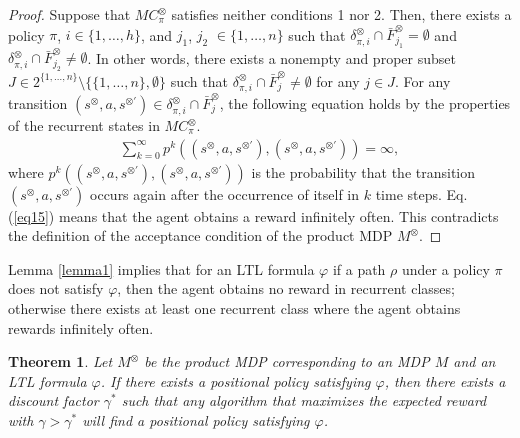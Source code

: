 \documentclass[letterpaper, 10 pt, conference]{ieeeconf}  %
\newtheorem{theorem}{Theorem}
\begin{document}
\begin{proof}
  Suppose that $MC^{\otimes}_{\pi}$ satisfies neither conditions 1 nor 2. Then, there exists a policy $\pi$, $i \in \{ 1, \ldots ,h \}$, and $j_1$, $j_2$ $\in \{ 1, \ldots ,n \}$ such that $\delta^{\otimes}_{\pi,i} \cap \bar{F}^{\otimes}_{j_1} = \emptyset$ and $\delta^{\otimes}_{\pi,i} \cap \bar{F}^{\otimes}_{j_2} \neq \emptyset$. In other words, there exists a nonempty and proper subset $J \in 2^{\{ 1, \ldots ,n \}} \setminus \{ \{ 1, \ldots ,n \}, \emptyset \}$ such that $ \delta^{\otimes}_{\pi,i} \cap \bar{F}^{\otimes}_j \neq \emptyset $ for any $j \in J$.
   For any transition $ (s^{\otimes},a,s^{\otimes \prime}) \in \delta^{\otimes}_{\pi,i} \cap \bar{F}^{\otimes}_j$, the following equation holds by the properties of the recurrent states in $MC^{\otimes}_{\pi}$\cite{ESS}.
  \begin{align}
    \sum_{k=0}^{\infty} p^k((s^{\otimes},a,s^{\otimes \prime}),(s^{\otimes},a,s^{\otimes \prime})) = \infty,
    \label{eq15}
  \end{align}
  where $p^k((s^{\otimes},a,s^{\otimes \prime}),(s^{\otimes},a,s^{\otimes \prime}))$ is the probability that the transition $(s^{\otimes},a,s^{\otimes \prime})$ occurs again after the occurrence of itself in $k$ time steps. Eq. (\ref{eq15}) means that the agent obtains a reward infinitely often. This contradicts the definition of the acceptance condition of the product MDP $M^{\otimes}$.
\end{proof}

Lemma \ref{lemma1} implies that for an LTL formula $\varphi$ if a path $\rho$ under a policy $\pi$ does not satisfy $\varphi$, then the agent obtains no reward in recurrent classes; otherwise there exists at least one recurrent class where the agent obtains rewards infinitely often.

\begin{theorem}
  Let $M^{\otimes}$ be the product MDP corresponding to an MDP $M$ and an LTL formula $\varphi$. If there exists a positional policy satisfying $\varphi$, then there exists a discount factor $\gamma^{\ast}$ such that any algorithm that maximizes the expected reward with $\gamma > \gamma^{\ast}$ will find a positional policy satisfying $\varphi$.
  \label{theorem1}
\end{theorem}
\end{document}
